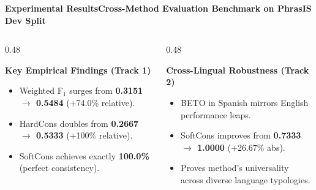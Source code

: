 \documentclass[aspectratio=169,10pt]{beamer}
\begin{document}
\begin{frame}{\textbf{Experimental Results}}{\textbf{Cross-Method Evaluation Benchmark on PhrasIS Dev Split}}
  \begin{columns}[T]
    \begin{column}{0.48\textwidth}
      \begin{block}{\textbf{Key Empirical Findings (Track 1)}}
        \footnotesize
        \begin{itemize}
          \item Weighted F$_1$ surges from \textbf{0.3151 $\to$ 0.5484} (+74.0\% relative).
          \item HardCons doubles from \textbf{0.2667 $\to$ 0.5333} (+100\% relative).
          \item SoftCons achieves exactly \textbf{100.0\%} (perfect consistency).
        \end{itemize}
      \end{block}
    \end{column}
    \begin{column}{0.48\textwidth}
      \begin{block}{\textbf{Cross-Lingual Robustness (Track 2)}}
        \footnotesize
        \begin{itemize}
          \item BETO in Spanish mirrors English performance leaps.
          \item SoftCons improves from \textbf{0.7333 $\to$ 1.0000} (+26.67\% abs).
          \item Proves method's universality across diverse language typologies.
        \end{itemize}
      \end{block}
    \end{column}
  \end{columns}
\end{frame}
\end{document}
